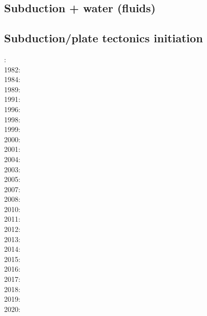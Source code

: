 \subsection{Subduction + water (fluids)}

{\scriptsize
\noindent
\cite{vakp02}
\cite{roms10}
\cite{geme11}\cite{vahs11}
\cite{fagm12}
\cite{qubu14}\cite{mabv14}\cite{malg14}\cite{wisv14}
\cite{bomv15}
\cite{ceww17}\cite{wewv17}
\cite{ceww19}\cite{meag19}\cite{ligc19}
}

\subsection{Subduction/plate tectonics initiation}

{\scriptsize
{}: \cite{bird78}\\
1982: \cite{clwv82}\\
1984: \cite{cade84}\\
1989: \cite{clwv89}\\
1991: \cite{muph91}\\
1996: \cite{kest96}\\
1998: \cite{togu98}\\
1999: \cite{fagd99}\\
2000: \cite{pybf00}\\
2001: \cite{dohe01}\cite{reyb01}\cite{brry01}\\
2004: \cite{ster04}\cite{guhl04}\cite{solo04}\\
2003: \cite{hags03}\\
2005: \cite{bihi05}\\
2007: \cite{kore07}\\
2008: \cite{uegs08}\\
2010: \cite{nigm10}\cite{bucl10}\\
2011: \cite{bagw11}\cite{nigm11}\cite{legu11}\\
2012: \cite{stri12}\cite{thka12}\cite{lega12}\cite{shch12}\\
2013: \cite{dyge13}\cite{mana13}\cite{kore13}\cite{mibg13}\\
2014: \cite{recf14}\cite{macg14}\\
2015: \cite{matv15}\cite{pebu15}\cite{vapm15}\cite{legu15}\\
2016: \cite{crta16}\cite{maka16}\\
2017: \cite{magm17}\\
2018: \cite{zhlg18}\cite{basq18}\\
2019: \cite{begb19}\cite{gubg19}\cite{ulcw19}\\
2020: \cite{arla20}
}

